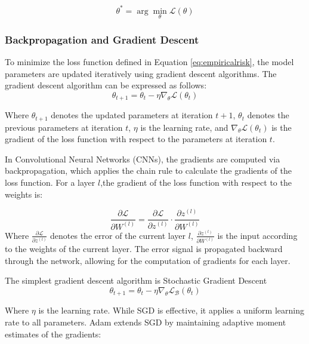 \begin{equation}
\theta^* = \arg\min_{\theta} \mathcal{L}(\theta)
\label{eq:optimization}
\end{equation}

\subsubsection{Backpropagation and Gradient Descent}

To minimize the loss function defined in Equation \ref{eq:empiricalrisk}, 
the model parameters are updated iteratively using gradient 
descent algorithms. The gradient descent algorithm can be expressed as follows:
\begin{equation}
\theta_{t+1} = \theta_t - \eta \nabla_\theta \mathcal{L}(\theta_t)
\label{eq:gradientdescent}
\end{equation}

Where $\theta_{t+1}$ denotes the updated parameters at iteration $t+1$, $\theta_t$ denotes the previous parameters at iteration $t$, $\eta$ is the learning rate, and $\nabla_\theta \mathcal{L}(\theta_t)$ is the gradient of the loss function with respect to the parameters at iteration $t$.


In Convolutional Neural Networks (CNNs), the gradients are computed via backpropagation, which 
applies the chain rule to calculate the gradients of the loss 
function. For a layer $l$,the gradient of the loss function 
with respect to the weights is:

\begin{equation}
\frac{\partial \mathcal{L}}{\partial W^{(l)}} = 
\frac{\partial \mathcal{L}}{\partial z^{(l)}} \cdot 
\frac{\partial z^{(l)}}{\partial W^{(l)}}
\label{eq:chainrule}
\end{equation}
Where $\frac{\partial \mathcal{L}}{\partial z^{(l)}}$ denotes the error of the current layer $l$, 
$\frac{\partial z^{(l)}}{\partial W^{(l)}}$ is the input according to the weights of the current layer.
The error signal is propagated backward through the network, allowing for the computation of gradients for each layer.

The simplest gradient descent algorithm is Stochastic Gradient Descent 
\begin{equation}
\theta_{t+1} = \theta_t - \eta \nabla_\theta 
\mathcal{L}_{\mathcal{B}}(\theta_t)
\label{eq:sgd}
\end{equation}

Where $\eta$ is the learning rate. While SGD is effective, 
it applies a uniform learning rate to all parameters. Adam 
extends SGD by maintaining adaptive moment estimates of the 
gradients:

